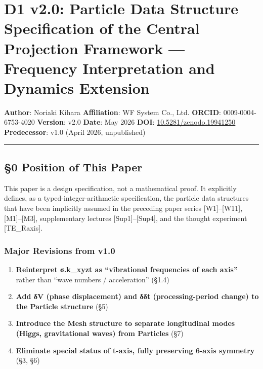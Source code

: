 \documentclass[a4paper,11pt]{article}
\providecommand{\tightlist}{\setlength{\itemsep}{0pt}\setlength{\parskip}{0pt}}
\begin{document}
\section{D1 v2.0: Particle Data Structure Specification of the Central
Projection Framework --- Frequency Interpretation and Dynamics
Extension}\label{d1-v2.0-particle-data-structure-specification-of-the-central-projection-framework-frequency-interpretation-and-dynamics-extension}

\textbf{Author}: Noriaki Kihara \textbf{Affiliation}: WF System Co.,
Ltd. \textbf{ORCID}: 0009-0004-6753-4020 \textbf{Version}: v2.0
\textbf{Date}: May 2026 \textbf{DOI}:
\href{https://doi.org/10.5281/zenodo.19941250}{10.5281/zenodo.19941250}
\textbf{Predecessor}: v1.0 (April 2026, unpublished)

\begin{center}\rule{0.5\linewidth}{0.5pt}\end{center}

\subsection{§0 Position of This Paper}\label{position-of-this-paper}

This paper is a design specification, not a mathematical proof. It
explicitly defines, as a typed-integer-arithmetic specification, the
particle data structures that have been implicitly assumed in the
preceding paper series {[}W1{]}--{[}W11{]}, {[}M1{]}--{[}M3{]},
supplementary lectures {[}Sup1{]}--{[}Sup4{]}, and the thought
experiment {[}TE\_Raxis{]}.

\subsubsection{Major Revisions from
v1.0}\label{major-revisions-from-v1.0}

\begin{enumerate}
\def\labelenumi{\arabic{enumi}.}
\tightlist
\item
  \textbf{Reinterpret σ.k\_xyzt as ``vibrational frequencies of each
  axis''} rather than ``wave numbers / acceleration'' (§1.4)
\item
  \textbf{Add δV (phase displacement) and δδt (processing-period change)
  to the Particle structure} (§5)
\item
  \textbf{Introduce the Mesh structure to separate longitudinal modes
  (Higgs, gravitational waves) from Particles} (§7)
\item
  \textbf{Eliminate special status of t-axis, fully preserving 6-axis
  symmetry} (§3, §6)
\end{enumerate}
\end{document}
